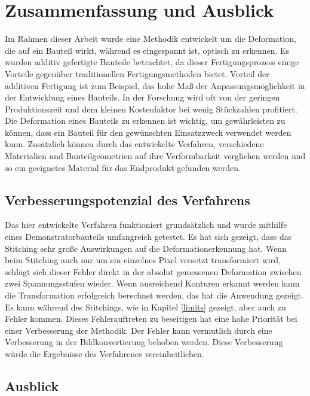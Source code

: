 
\chapter{Zusammenfassung und Ausblick}

Im Rahmen dieser Arbeit wurde eine Methodik entwickelt um 
die Deformation, die auf ein Bauteil wirkt, während es eingespannt 
ist, optisch zu erkennen. Es wurden additiv gefertigte Bauteile 
betrachtet, da dieser Fertigungsprozess einige Vorteile gegenüber
traditionellen Fertigungsmethoden bietet. 
Vorteil der additiven Fertigung ist zum Beispiel, das hohe Maß der 
Anpassungsmöglichkeit in der Entwicklung eines Bauteils. In der Forschung 
wird oft von der geringen Produktionszeit und dem kleinen Kostenfaktor 
bei wenig Stückzahlen profitiert. Die Deformation eines Bauteils zu 
erkennen ist wichtig, um gewährleisten zu können, dass ein Bauteil für 
den gewünschten Einsatzzweck verwendet werden kann. Zusätzlich können 
durch das entwickelte Verfahren, verschiedene Materialien und Bauteilgeometrien 
auf ihre Verformbarkeit verglichen werden und so ein geeignetes Material 
für das Endprodukt gefunden werden.

\section{Verbesserungspotenzial des Verfahrens}

Das hier entwickelte Verfahren funktioniert grundsätzlich und wurde mithilfe 
eines Demonstratorbauteils umfangreich getestet. Es hat sich gezeigt, dass 
das Stitching sehr große Auswirkungen auf die Deformationerkennung hat. 
Wenn beim Stitching auch nur um ein einzelnes Pixel versetzt transformiert wird,
schlägt sich dieser Fehler direkt in der absolut gemessenen 
Deformation zwischen zwei Spannungsstufen wieder.
Wenn ausreichend Konturen erkannt werden kann die Transformation erfolgreich
berechnet werden, das hat die Anwendung gezeigt. Es kann während des Stitchings, wie in Kapitel 
\ref{limits} gezeigt, aber auch zu Fehler kommen. 
Dieses Fehlerauftreten zu beseitigen hat eine hohe Priorität 
bei einer Verbesserung der Methodik. 
Der Fehler kann vermutlich durch eine Verbesserung in der Bildkonvertierung
behoben werden. Diese Verbesserung würde die Ergebnisse 
des Verfahrenes vereinheitlichen.

\section{Ausblick}

